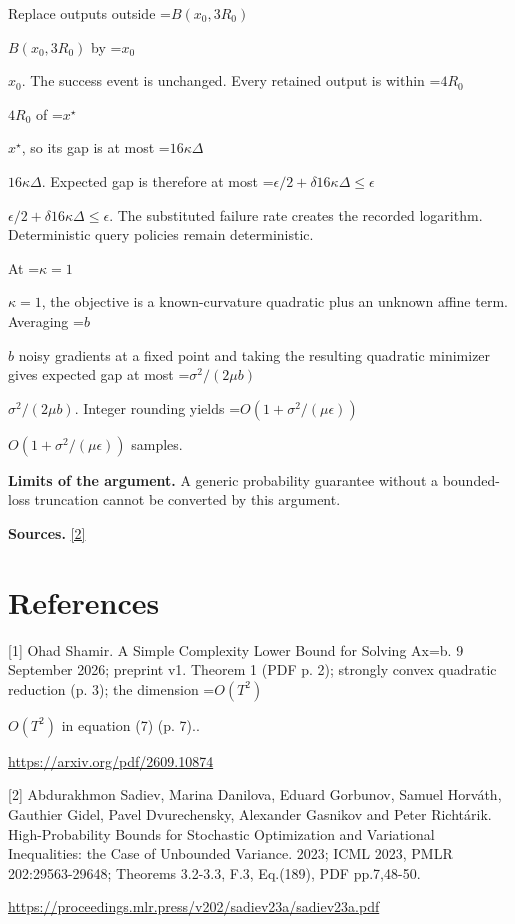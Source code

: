 \documentclass[10pt,a4paper]{article}
\newcommand{\AtlasMath}[1]{\par\begingroup\centering\setbox0=\hbox{$\displaystyle #1$}\ifdim\wd0>1.4\linewidth\typeout{ATLAS WIDE FORMULA: \the\wd0}\fi\ifdim\wd0>\linewidth\resizebox{\linewidth}{!}{\box0}\else\box0\fi\par\endgroup}
\newcommand{\AtlasInlineMath}[1]{\begingroup\setbox0=\hbox{$#1$}\ifdim\wd0>.4\linewidth\endgroup\AtlasMath{#1}\else\endgroup$#1$\fi}
\begin{document}
Replace outputs outside \AtlasInlineMath{B(x_0,3R_0)} by \AtlasInlineMath{x_0}. The success event is unchanged. Every retained output is within \AtlasInlineMath{4R_0} of \AtlasInlineMath{x^\star}, so its gap is at most \AtlasInlineMath{16\kappa\Delta}. Expected gap is therefore at most
\AtlasInlineMath{\epsilon/2+\delta16\kappa\Delta\le\epsilon}.
The substituted failure rate creates the recorded logarithm. Deterministic query policies remain deterministic.

At \AtlasInlineMath{\kappa=1}, the objective is a known-curvature quadratic plus an unknown affine term. Averaging \AtlasInlineMath{b} noisy gradients at a fixed point and taking the resulting quadratic minimizer gives expected gap at most \AtlasInlineMath{\sigma^2/(2\mu b)}. Integer rounding yields \AtlasInlineMath{O(1+\sigma^2/(\mu\epsilon))} samples.

\textbf{Limits of the argument.} A generic probability guarantee without a bounded-loss truncation cannot be converted by this argument.

\textbf{Sources.} \href{https://proceedings.mlr.press/v202/sadiev23a/sadiev23a.pdf}{[2]}

\section{References}
[1] Ohad Shamir. A Simple Complexity Lower Bound for Solving Ax=b. 9 September 2026; preprint v1. Theorem 1 (PDF p. 2); strongly convex quadratic reduction (p. 3); the dimension \AtlasInlineMath{O(T^2)} in equation (7) (p. 7)..

\url{https://arxiv.org/pdf/2609.10874}

[2] Abdurakhmon Sadiev, Marina Danilova, Eduard Gorbunov, Samuel Horváth, Gauthier Gidel, Pavel Dvurechensky, Alexander Gasnikov and Peter Richtárik. High-Probability Bounds for Stochastic Optimization and Variational Inequalities: the Case of Unbounded Variance. 2023; ICML 2023, PMLR 202:29563-29648; Theorems 3.2-3.3, F.3, Eq.(189), PDF pp.7,48-50.

\url{https://proceedings.mlr.press/v202/sadiev23a/sadiev23a.pdf}
\end{document}
